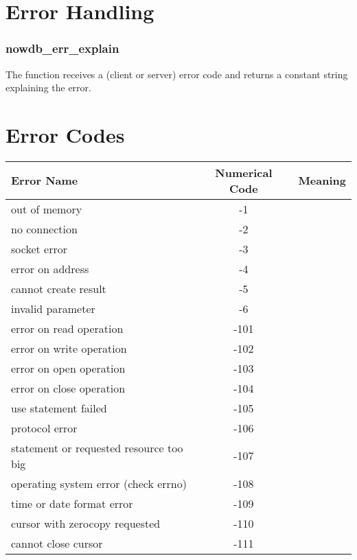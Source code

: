 \section{Error Handling}
\subsubsection{nowdb\_err\_explain}
The function receives a (client or server) error code
and returns a constant string explaining the error.

\begin{minipage}{\textwidth}
\section{Error Codes}\label{sec_clnterrors}
\bgroup
\renewcommand{\arraystretch}{1.3}
\begin{center}
\begin{longtable}{||l||c||l||}\hline
\textbf{Error Name} & \textbf{Numerical Code} & \textbf{Meaning} \\\hline\endhead\hline
out of memory                             &     -1 & \\\hline\hline
no connection                             &     -2 & \\\hline\hline
socket error                              &     -3 & \\\hline\hline
error on address                          &     -4 & \\\hline\hline
cannot create result                      &     -5 & \\\hline\hline
invalid parameter                         &     -6 & \\\hline\hline
error on read operation                   &   -101 & \\\hline\hline
error on write operation                  &   -102 & \\\hline\hline
error on open  operation                  &   -103 & \\\hline\hline
error on close operation                  &   -104 & \\\hline\hline
use statement failed                      &   -105 & \\\hline\hline
protocol error                            &   -106 & \\\hline\hline
statement or requested resource too big   &   -107 & \\\hline\hline
operating system error (check errno)      &   -108 & \\\hline\hline
time or date format error                 &   -109 & \\\hline\hline
cursor with zerocopy requested            &   -110 & \\\hline\hline
cannot close cursor                       &   -111 & \\\hline
\end{longtable}
\end{center}
\egroup
\end{minipage}
